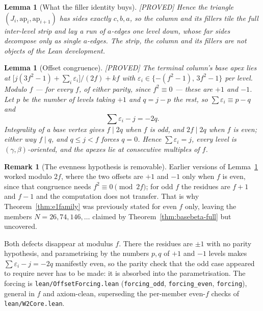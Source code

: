 \documentclass[11pt,reqno]{amsart}
\theoremstyle{plain}
\newtheorem{lemma}[theorem]{Lemma}
\theoremstyle{definition}
\newtheorem{remark}[theorem]{Remark}
\newcommand{\lab}[1]{\hfill\textnormal{\footnotesize\textsc{[#1]}}}
\begin{document}
\begin{lemma}[What the filler identity buys]\label{lem:filler}\lab{PROVED}
Hence the triangle $(J_i,\mathrm{ap}_i,\mathrm{ap}_{i+1})$ has sides exactly $c,b,a$, so the column
and its fillers tile the full inter-level strip and lay a run of $a$-edges one level down, whose far
sides decompose only as single $a$-edges. The strip, the column and its fillers are not objects of
the Lean development.
\end{lemma}

\begin{lemma}[Offset congruence]\label{lem:offsets}\lab{PROVED}
The terminal column's base apex lies at $\bigl[j(3f^2-1)+\sum_{i}\varepsilon_i\bigr]/(2f)+kf$ with
$\varepsilon_i\in\{-(f^2-1),\,3f^2-1\}$ per level. Modulo $f$ --- for every $f$, of either parity,
since $f^2\equiv0$ --- these are $+1$ and $-1$. Let $p$ be the number of levels taking $+1$ and
$q=j-p$ the rest, so $\sum\varepsilon_i\equiv p-q$ and
\[
\sum\varepsilon_i-j=-2q .
\]
Integrality of a base vertex gives $f\mid 2q$ when $f$ is odd, and $2f\mid 2q$ when $f$ is even;
either way $f\mid q$, and $q\le j<f$ forces $q=0$. Hence $\sum\varepsilon_i=j$, every level is
$(\gamma,\beta)$-oriented, and the apexes lie at consecutive multiples of $f$.
\end{lemma}

\begin{remark}[The evenness hypothesis is removable]\label{rem:parity}
Earlier versions of Lemma~\ref{lem:offsets} worked modulo $2f$, where the two offsets are $+1$ and
$-1$ only when $f$ is even, since that congruence needs $f^2\equiv0\pmod{2f}$; for odd $f$ the
residues are $f+1$ and $f-1$ and the computation does not transfer. That is why
Theorem~\ref{thm:e1family} was previously stated for even $f$ only, leaving the members
$N=26,74,146,\dots$ claimed by Theorem~\ref{thm:basebeta-full} but uncovered.

Both defects disappear at modulus $f$. There the residues are $\pm1$ with no parity hypothesis, and
parametrising by the numbers $p,q$ of $+1$ and $-1$ levels makes $\sum\varepsilon_i-j=-2q$
manifestly even, so the parity check that the odd case appeared to require never has to be made: it
is absorbed into the parametrisation. The forcing is
\textup{\texttt{lean/OffsetForcing.lean}} (\texttt{forcing\_odd}, \texttt{forcing\_even},
\texttt{forcing}), general in $f$ and axiom-clean, superseding the per-member even-$f$ checks of
\texttt{lean/W2Core.lean}.
\end{remark}
\end{document}
